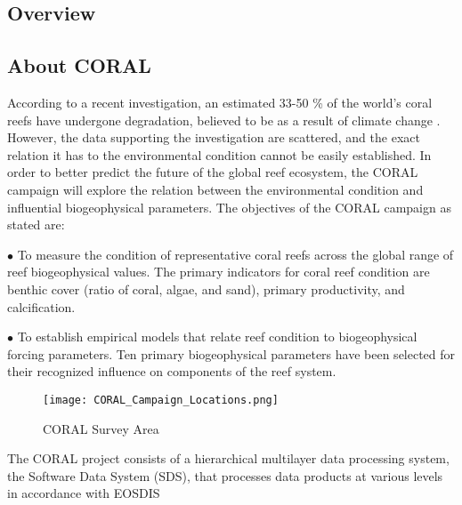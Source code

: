 \documentclass{article}
\begin{document}
\begin{multicols*}{2}
\section{Overview}
\subsection{About CORAL}
	According to a recent investigation, an estimated 33-50 \% of the world's coral reefs have undergone degradation, believed to be as a result of climate change \cite{Reef_Studies}. However, the data supporting the investigation are scattered, and the exact relation it has to the environmental condition cannot be easily established. In order to better predict the future of the global reef ecosystem, the CORAL campaign will explore the relation between the environmental condition and influential biogeophysical parameters. The objectives of the CORAL campaign as stated \cite{bio_parameters} are:

$\bullet$ To measure the condition of representative coral reefs across the global range of reef biogeophysical values. The primary indicators for coral reef condition are benthic cover (ratio of coral, algae, and sand), primary productivity, and calcification.

$\bullet$ To establish empirical models that relate reef condition to biogeophysical forcing parameters. Ten primary biogeophysical parameters have been selected for their recognized influence on components of the reef system. \cite{bio_parameters} 

\begin{figure}[H]
\centering
\texttt{[image: CORAL\_Campaign\_Locations.png]}
\caption{CORAL Survey Area \cite{bio_parameters}}
\end{figure}
The CORAL project consists of a hierarchical multilayer data processing system, the Software Data System (SDS), that processes data products at various levels in accordance with EOSDIS \cite{EOSIS}


\end{multicols*}
\end{document}
